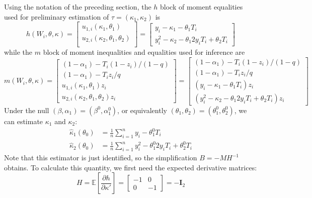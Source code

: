 \documentclass[12pt]{article}
\begin{document}
Using the notation of the preceding section, the $h$ block of moment equalities used for preliminary estimation of $\tau = (\kappa_1, \kappa_2)$ is 
\[
  h(W_i, \theta, \kappa) = \left[
  \begin{array}{l}
    u_{1,i}(\kappa_1,\theta_1)\\
    u_{2,i}(\kappa_2, \theta_1, \theta_2)\\
  \end{array}
\right] = 
\left[
\begin{array}{l}
  y_i - \kappa_1 - \theta_1 T_i\\
  y^2_i - \kappa_2 - \theta_1 2 y_iT_i + \theta_2 T_i
\end{array}
\right]
\]
while the $m$ block of moment inequalities and equalities used for inference are
\[
  m(W_i, \theta, \kappa) = \left[
  \begin{array}{l}
    (1 - \alpha_1) - T_i(1 - z_i)/(1 - q)\\
    (1 - \alpha_1) - T_iz_i/q\\
    u_{1,i}(\kappa_1, \theta_1) z_i \\
    u_{2,i}(\kappa_2, \theta_1, \theta_2) z_i
  \end{array}
\right]
   = \left[
  \begin{array}{l}
    (1 - \alpha_1) - T_i(1 - z_i)/(1 - q)\\
    (1 - \alpha_1) - T_iz_i/q\\
    (y_i - \kappa_1 - \theta_1 T_i) z_i\\
    (y_i^2 - \kappa_2 - \theta_1 2 y_i T_i + \theta_2 T_i) z_i 
  \end{array}
\right]
\]
Under the null $(\beta, \alpha_1) = (\beta^0, \alpha_1^0)$, or equivalently $(\theta_1, \theta_2) = (\theta_1^0, \theta_2^0)$, we can estimate $\kappa_1$ and $\kappa_2$:
\begin{align*}
  \widehat{\kappa}_1(\theta_0) &= \frac{1}{n} \sum_{i=1}^n y_i - \theta_1^0 T_i\\
  \widehat{\kappa}_2(\theta_0) &= \frac{1}{n}\sum_{i=1}^n y^2_i - \theta_1^0 2y_i T_i + \theta_2^0 T_i 
\end{align*}
Note that this estimator is just identified, so the simplification $B = -MH^{-1}$ obtains.
To calculate this quantity, we first need the expected derivative matrices: 
\[
  H = \mathbb{E}\left[ \frac{\partial h}{\partial \kappa'} \right] = 
  \left[
  \begin{array}{rr}
    -1 & 0 \\
    0 & -1
  \end{array}
\right] = -\mathbf{I}_2
\]
\end{document}
